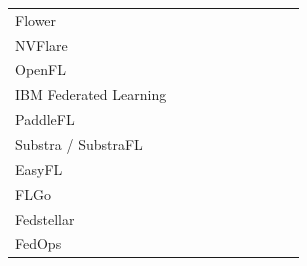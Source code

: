 \documentclass[preprint,5p, 10pt, times]{elsarticle}
\newcommand{\good}[1]{\cellcolor{scoregreen}#1}
\newcommand{\medscore}[1]{\cellcolor{scoreyellow}#1}
\newcommand{\low}[1]{\cellcolor{scorered}#1}
\begin{document}
\begin{table}[t]
{\begin{tabular}{lccccccccc}
Flower \cite{beutel2020flower}
& \good{} & \good{} & \good{} & \medscore{} & \good{} & \medscore{} & \good{} & \low{} & \good{} \\

NVFlare\cite{roth2022nvidia}
& \good{} & \good{} & \good{} & \good{} & \good{} & \good{} & \good{} & \medscore{} & \good{} \\

OpenFL\cite{reina2021openfl}
& \good{} & \medscore{} & \medscore{} & \good{} & \medscore{} & \good{} & \medscore{} & \low{} & \medscore{} \\

IBM Federated Learning\cite{ludwig2020ibm}
& \good{} & \good{} & \good{} & \good{} & \medscore{} & \good{} & \medscore{} & \low{} & \medscore{} \\

PaddleFL\cite{paddlefl}
& \good{} & \medscore{} & \good{} & \good{} & \medscore{} & \medscore{} & \low{} & \low{} & \low{} \\

Substra / SubstraFL\cite{galtier2019substra}
& \good{} & \good{} & \medscore{} & \medscore{} & \good{} & \good{} & \good{} & \medscore{} & \good{} \\

EasyFL\cite{zhuang2022easyfl}
& \good{} & \good{} & \medscore{} & \low{} & \medscore{} & \good{} & \good{} & \low{} & \medscore{} \\

FLGo\cite{wang2023flgo}
& \good{} & \low{} & \good{} & \low{} & \medscore{} & \medscore{} & \good{} & \low{} & \medscore{} \\

Fedstellar\cite{beltran2024fedstellar}
& \good{} & \low{} & \medscore{} & \low{} & \good{} & \good{} & \medscore{} & \low{} & \low{} \\

FedOps\cite{moon2024fedops,yang2023flscalize}
& \good{} & \good{} & \medscore{} & \low{} & \medscore{} & \good{} & \medscore{} & \low{} & \medscore{} \\

\bottomrule
\end{tabular}%
}
\end{table}
\end{document}
